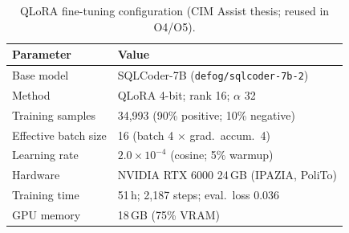 \begin{table}[t]
  \centering
  \caption{QLoRA fine-tuning configuration (CIM Assist thesis; reused in O4/O5).}
  \label{tab:finetuning}
  \small
  \begin{tabular}{ll}
    \toprule
    Parameter & Value \\
    \midrule
    Base model & SQLCoder-7B (\texttt{defog/sqlcoder-7b-2}) \\
    Method & QLoRA 4-bit; rank 16; $\alpha$ 32 \\
    Training samples & 34,993 (90\% positive; 10\% negative) \\
    Effective batch size & 16 (batch 4 $\times$ grad.\ accum.\ 4) \\
    Learning rate & $2.0 \times 10^{-4}$ (cosine; 5\% warmup) \\
    Hardware & NVIDIA RTX 6000 24\,GB (IPAZIA, PoliTo) \\
    Training time & 51\,h; 2,187 steps; eval.\ loss 0.036 \\
    GPU memory & 18\,GB (75\% VRAM) \\
    \bottomrule
  \end{tabular}
\end{table}
